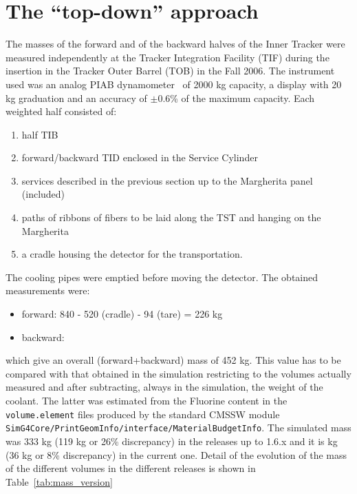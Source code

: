 \documentclass{cmspaper}
\begin{document}
\section{The ``top-down'' approach}
The masses of the forward and of the backward halves of the Inner
Tracker were measured independently at the Tracker Integration
Facility (TIF) during the insertion in the Tracker Outer Barrel (TOB)
in the Fall 2006. 
The instrument used was an analog PIAB dynamometer~\cite{piab}  of
2000 kg capacity, a display with 20 kg graduation and an accuracy of
$\pm$0.6\% of the maximum capacity. 
Each weighted half consisted of: 
\begin{enumerate}
\item half TIB  
\item forward/backward TID enclosed in the Service Cylinder
\item services described in the previous section up to the Margherita
  panel (included)
\item paths of ribbons of fibers to be laid along the TST and hanging on the
Margherita 
\item a cradle housing the detector for the transportation. 
\end{enumerate}
The cooling pipes were emptied before moving the detector.
The obtained measurements were:
\begin{itemize}
\item forward: 840 - 520 (cradle) - 94 (tare) = 226 kg 
\item backward:
\end{itemize}
which give an overall (forward+backward) mass of 452 kg.
This value has to be compared with that obtained in the simulation
restricting to the volumes actually measured and after subtracting,
always in the simulation, the weight of the coolant. 
The latter was estimated from the Fluorine content  in the
{\tt volume.element} files produced by the standard CMSSW module {\tt
  SimG4Core/PrintGeomInfo/interface/MaterialBudgetInfo}.
The simulated mass was 333 kg (119 kg or 26\% discrepancy) in the
releases up to 1.6.x and it is   kg (36 kg or 8\%
discrepancy) in the current one.
Detail of the evolution of the mass of the different volumes in the
different releases is shown in Table~\ref{tab:mass_version}
\end{document}
